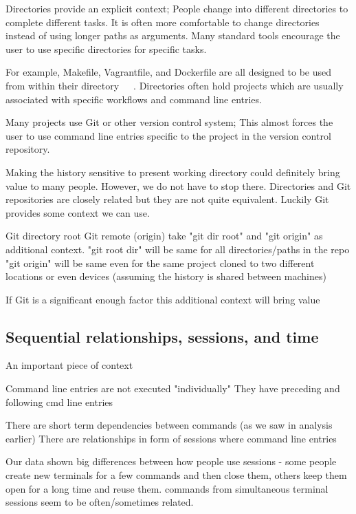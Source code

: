 \documentclass[thesis=M,english]{FITthesis}[2012/10/20]
\let\myCite\cite
\renewcommand\cite{\unskip~\myCite}
\begin{document}
Directories provide an explicit context; People change into different directories to complete different tasks. It is often more comfortable to change directories instead of using longer paths as arguments. Many standard tools encourage the user to use specific directories for specific tasks. 

For example, Makefile, Vagrantfile, and Dockerfile are all designed to be used from within their directory\cite{man-make}\cite{docs-vagrantfile}\cite{docs-dockerfile}. 
Directories often hold projects which are usually associated with specific workflows and command line entries.

Many projects use Git or other version control system; This almost forces the user to use command line entries specific to the project in the version control repository. 


Making the history sensitive to present working directory could definitely bring value to many people.
However, we do not have to stop there. Directories and Git repositories are closely related but they are not quite equivalent. Luckily Git provides some context we can use. 

Git directory root
Git remote (origin)
take "git dir root" and "git origin" as additional context.
"git root dir" will be same for all directories/paths in the repo
"git origin" will be same even for the same project cloned to two different locations or even devices (assuming the history is shared between machines)


If Git is a significant enough factor this additional context will bring value


\subsection{Sequential relationships, sessions, and time}

An important piece of context

Command line entries are not executed "individually"
They have preceding and following cmd line entries

There are short term dependencies between commands (as we saw in analysis earlier)
There are relationships in form of sessions where command line entries 

Our data shown big differences between how people use sessions - some people create new terminals for a few commands and then close them, others keep them open for a long time and reuse them. commands from simultaneous terminal sessions seem to be often/sometimes related.
 
\end{document}
